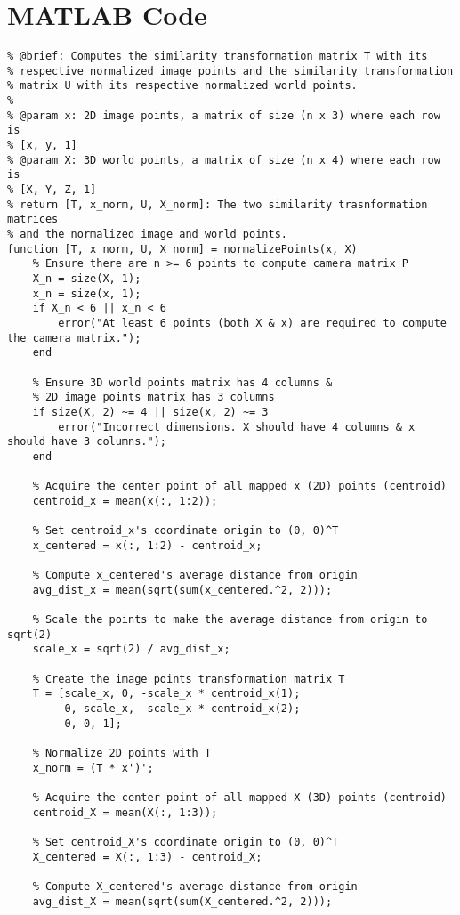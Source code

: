 \documentclass[12pt]{article}
\begin{document}
\section{MATLAB Code}
\begin{lstlisting}
% @brief: Computes the similarity transformation matrix T with its
% respective normalized image points and the similarity transformation
% matrix U with its respective normalized world points.
% 
% @param x: 2D image points, a matrix of size (n x 3) where each row is
% [x, y, 1]
% @param X: 3D world points, a matrix of size (n x 4) where each row is
% [X, Y, Z, 1]
% return [T, x_norm, U, X_norm]: The two similarity trasnformation matrices
% and the normalized image and world points.
function [T, x_norm, U, X_norm] = normalizePoints(x, X)
    % Ensure there are n >= 6 points to compute camera matrix P
    X_n = size(X, 1);
    x_n = size(x, 1);
    if X_n < 6 || x_n < 6
        error("At least 6 points (both X & x) are required to compute the camera matrix.");
    end

    % Ensure 3D world points matrix has 4 columns &
    % 2D image points matrix has 3 columns
    if size(X, 2) ~= 4 || size(x, 2) ~= 3
        error("Incorrect dimensions. X should have 4 columns & x should have 3 columns.");
    end
    
    % Acquire the center point of all mapped x (2D) points (centroid)
    centroid_x = mean(x(:, 1:2));
    
    % Set centroid_x's coordinate origin to (0, 0)^T
    x_centered = x(:, 1:2) - centroid_x;
    
    % Compute x_centered's average distance from origin
    avg_dist_x = mean(sqrt(sum(x_centered.^2, 2)));

    % Scale the points to make the average distance from origin to sqrt(2)
    scale_x = sqrt(2) / avg_dist_x;

    % Create the image points transformation matrix T
    T = [scale_x, 0, -scale_x * centroid_x(1);
         0, scale_x, -scale_x * centroid_x(2);
         0, 0, 1];

    % Normalize 2D points with T
    x_norm = (T * x')';

    % Acquire the center point of all mapped X (3D) points (centroid)
    centroid_X = mean(X(:, 1:3));

    % Set centroid_X's coordinate origin to (0, 0)^T
    X_centered = X(:, 1:3) - centroid_X;
    
    % Compute X_centered's average distance from origin
    avg_dist_X = mean(sqrt(sum(X_centered.^2, 2)));
    

\end{lstlisting}
\end{document}
